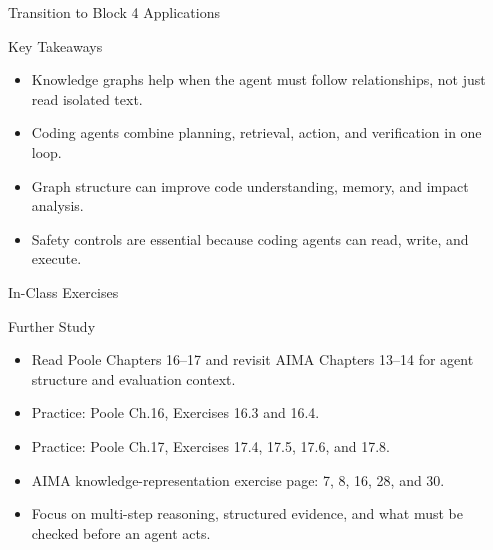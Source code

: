 \documentclass[aspectratio=169]{beamer}
\newcommand{\defaultdeckrefs}{AIMA4e Ch.10 pp.314--343; Poole3e Ch.16--17 pp.701--766; platform docs listed at end}
\newcommand{\currentsliderefs}{\defaultdeckrefs}
\newcommand{\setslideref}[1]{\gdef\currentsliderefs{#1}}
\begin{document}
\setslideref{AIMA4e Ch.13 pp.459--507; AIMA4e Ch.14 pp.509--540; Poole3e Ch.9--10 pp.381--454}
\begin{frame}{Transition to Block 4 Applications}
\begin{center}
\end{center}
\end{frame}

\begin{frame}{Key Takeaways}
\begin{itemize}
  \item Knowledge graphs help when the agent must follow relationships, not just read isolated text.
  \item Coding agents combine planning, retrieval, action, and verification in one loop.
  \item Graph structure can improve code understanding, memory, and impact analysis.
  \item Safety controls are essential because coding agents can read, write, and execute.
\end{itemize}
\end{frame}

\setslideref{AIMA4e Ch.10 pp.314--343; Poole3e Ch.16--17 pp.701--766; exercise prompt on slide}
\begin{frame}{In-Class Exercises}
\end{frame}

\begin{frame}{Further Study}
\begin{itemize}
  \item Read Poole Chapters 16--17 and revisit AIMA Chapters 13--14 for agent structure and evaluation context.
  \item Practice: Poole Ch.16, Exercises 16.3 and 16.4.
  \item Practice: Poole Ch.17, Exercises 17.4, 17.5, 17.6, and 17.8.
  \item AIMA knowledge-representation exercise page: 7, 8, 16, 28, and 30.
  \item Focus on multi-step reasoning, structured evidence, and what must be checked before an agent acts.
\end{itemize}
\end{frame}
\end{document}
